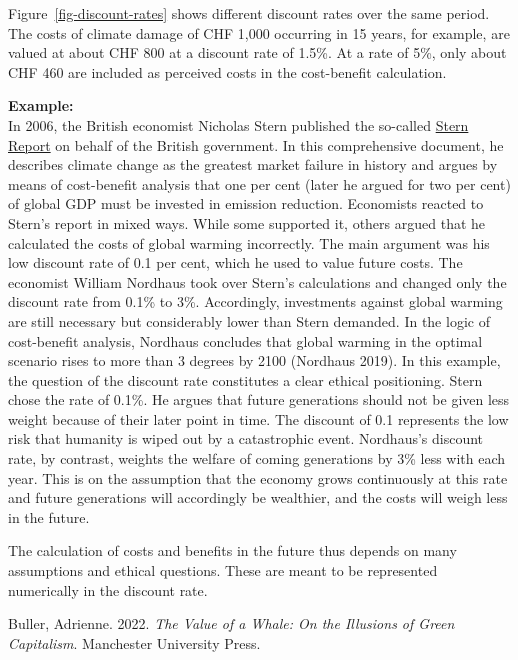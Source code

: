 \documentclass[
  british,
  a4paper,
  DIV=11,
  numbers=noendperiod,
  oneside,
  openany]{scrreprt}
\begin{document}
\begin{tcolorbox}
Figure~\ref{fig-discount-rates} shows different discount rates over the
same period. The costs of climate damage of CHF 1,000 occurring in 15
years, for example, are valued at about CHF 800 at a discount rate of
1.5\%. At a rate of 5\%, only about CHF 460 are included as perceived
costs in the cost-benefit calculation.

\textbf{Example:}\\
In 2006, the British economist Nicholas Stern published the so-called
\href{https://webarchive.nationalarchives.gov.uk/ukgwa/20100407172811/https:/www.hm-treasury.gov.uk/stern_review_report.htm}{Stern
Report} on behalf of the British government. In this comprehensive
document, he describes climate change as the greatest market failure in
history and argues by means of cost-benefit analysis that one per cent
(later he argued for two per cent) of global GDP must be invested in
emission reduction. Economists reacted to Stern's report in mixed ways.
While some supported it, others argued that he calculated the costs of
global warming incorrectly. The main argument was his low discount rate
of 0.1 per cent, which he used to value future costs. The economist
William Nordhaus took over Stern's calculations and changed only the
discount rate from 0.1\% to 3\%. Accordingly, investments against global
warming are still necessary but considerably lower than Stern demanded.
In the logic of cost-benefit analysis, Nordhaus concludes that global
warming in the optimal scenario rises to more than 3 degrees by 2100
(Nordhaus 2019). In this example, the question of the discount rate
constitutes a clear ethical positioning. Stern chose the rate of 0.1\%.
He argues that future generations should not be given less weight
because of their later point in time. The discount of 0.1 represents the
low risk that humanity is wiped out by a catastrophic event. Nordhaus's
discount rate, by contrast, weights the welfare of coming generations by
3\% less with each year. This is on the assumption that the economy
grows continuously at this rate and future generations will accordingly
be wealthier, and the costs will weigh less in the future.

The calculation of costs and benefits in the future thus depends on many
assumptions and ethical questions. These are meant to be represented
numerically in the discount rate.

\end{tcolorbox}

\begin{tcolorbox}[enhanced jigsaw, arc=.35mm, bottomrule=.15mm, bottomtitle=1mm, breakable, colback=white, colbacktitle=quarto-callout-note-color!10!white, colframe=quarto-callout-note-color-frame, coltitle=black, left=2mm, leftrule=.75mm, opacityback=0, opacitybacktitle=0.6, rightrule=.15mm, title={Further reading}, titlerule=0mm, toprule=.15mm, toptitle=1mm]

Buller, Adrienne. 2022. \emph{The Value of a Whale: On the Illusions of
Green Capitalism}. Manchester University Press.

\end{tcolorbox}
\end{document}
